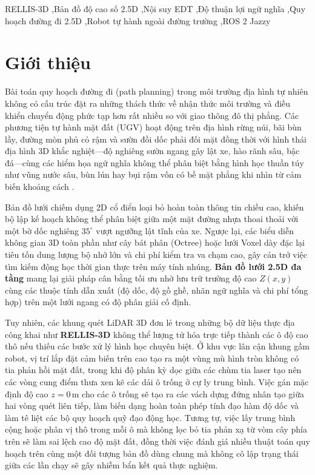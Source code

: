 \documentclass[a4paper,fleqn]{cas-sc}
\begin{document}
\begin{keywords}[Từ khóa]
RELLIS-3D \sep Bản đồ độ cao số 2.5D \sep Nội suy EDT \sep Độ thuận lợi ngữ nghĩa \sep Quy hoạch đường đi 2.5D \sep Robot tự hành ngoài đường trường \sep ROS 2 Jazzy
\end{keywords}

\maketitle

\section{Giới thiệu}
\label{sec:intro}

Bài toán quy hoạch đường đi (path planning) trong môi trường địa hình tự nhiên không có cấu trúc đặt ra những thách thức về nhận thức môi trường và điều khiển chuyển động phức tạp hơn rất nhiều so với giao thông đô thị phẳng. Các phương tiện tự hành mặt đất (UGV) hoạt động trên địa hình rừng núi, bãi bùn lầy, đường mòn phủ cỏ rậm và sườn đồi dốc phải đối mặt đồng thời với hình thái địa hình 3D khắc nghiệt—độ nghiêng sườn ngang gây lật xe, hào rãnh sâu, bậc đá—cùng các hiểm họa ngữ nghĩa không thể phân biệt bằng hình học thuần túy như vũng nước sâu, bùn lún hay bụi rậm vốn có bề mặt phẳng khi nhìn từ cảm biến khoảng cách \citep{pengjiang2020, jiayangliu2023, endo2024}.

Bản đồ lưới chiếm dụng 2D cổ điển loại bỏ hoàn toàn thông tin chiều cao, khiến bộ lập kế hoạch không thể phân biệt giữa một mặt đường nhựa thoai thoải với một bờ dốc nghiêng $35^\circ$ vượt ngưỡng lật tĩnh của xe. Ngược lại, các biểu diễn không gian 3D toàn phần như cây bát phân (Octree) hoặc lưới Voxel dày đặc lại tiêu tốn dung lượng bộ nhớ lớn và chi phí kiểm tra va chạm cao, gây cản trở việc tìm kiếm động học thời gian thực trên máy tính nhúng. \textbf{Bản đồ lưới 2.5D đa tầng} \citep{fankhauser2016grid} mang lại giải pháp cân bằng tối ưu nhờ lưu trữ trường độ cao $Z(x, y)$ cùng các thuộc tính dẫn xuất (độ dốc, độ gồ ghề, nhãn ngữ nghĩa và chi phí tổng hợp) trên một lưới ngang có độ phân giải cố định.

Tuy nhiên, các khung quét LiDAR 3D đơn lẻ trong những bộ dữ liệu thực địa công khai như \textbf{RELLIS-3D} \citep{pengjiang2020} không thể lượng tử hóa trực tiếp thành các ô độ cao thô nếu thiếu các bước xử lý hình học chuyên biệt. Ở khu vực lân cận khung gầm robot, vị trí lắp đặt cảm biến trên cao tạo ra một vùng mù hình tròn không có tia phản hồi mặt đất, trong khi độ phân kỳ dọc giữa các chùm tia laser tạo nên các vòng cung điểm thưa xen kẽ các dải ô trống ở cự ly trung bình. Việc gán mặc định độ cao $z = 0\,\text{m}$ cho các ô trống sẽ tạo ra các vách dựng đứng nhân tạo giữa hai vòng quét liên tiếp, làm biến dạng hoàn toàn phép tính đạo hàm độ dốc và làm tê liệt các bộ quy hoạch quỹ đạo động học. Tương tự, việc lấy trung bình cộng hoặc phân vị thô trong mỗi ô mà không lọc bỏ tia phản xạ từ vòm cây phía trên sẽ làm sai lệch cao độ mặt đất, đồng thời việc đánh giá nhiều thuật toán quy hoạch trên cùng một đối tượng bản đồ dùng chung mà không cô lập trạng thái giữa các lần chạy sẽ gây nhiễm bẩn kết quả thực nghiệm.
\end{document}

